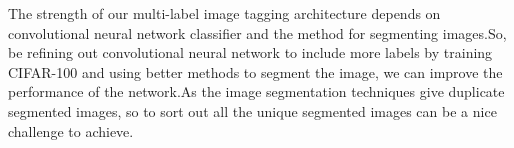 The strength of our multi-label image tagging architecture depends on convolutional neural network classifier and the method for segmenting images.So, be refining out convolutional neural network to include more labels by training CIFAR-100 and using better methods to segment the image, we can improve the performance of the network.As the image segmentation techniques give duplicate segmented images, so to sort out all the unique segmented images can be a nice challenge to achieve.